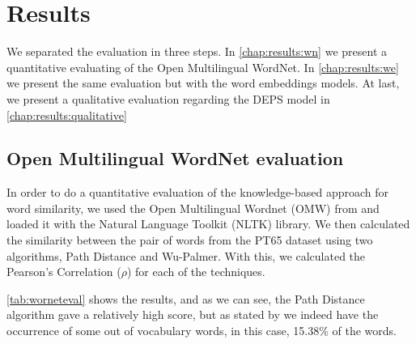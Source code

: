 \section{Results}\label{chap:results}


We separated the evaluation in three steps. In \autoref{chap:results:wn} we present a quantitative evaluating of the Open Multilingual WordNet. In \autoref{chap:results:we} we present the same evaluation but with the word embeddings models. At last, we present a qualitative evaluation regarding the DEPS model in \autoref{chap:results:qualitative}



\subsection{Open Multilingual WordNet evaluation}\label{chap:results:wn}

In order to do a quantitative evaluation of the knowledge-based approach for word similarity, we used the Open Multilingual Wordnet (OMW) from  and loaded it with the Natural Language Toolkit (NLTK) library. We then calculated the similarity between the pair of words from the PT65 dataset using two algorithms, Path Distance and Wu-Palmer. With this, we calculated the Pearson’s Correlation ($\rho$) for each of the techniques.

\autoref{tab:worneteval} shows the results, and as we can see, the Path Distance algorithm gave a relatively high score, but as stated by  we indeed have the occurrence of some out of vocabulary words, in this case, 15.38\% of the words.


